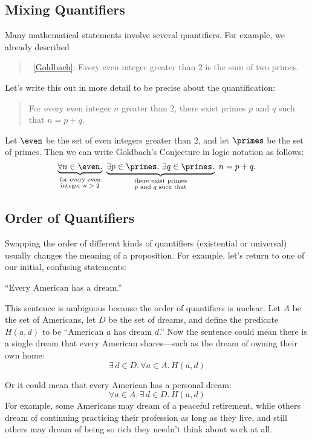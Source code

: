 \subsection{Mixing Quantifiers}

Many mathematical statements involve several quantifiers.  For
example, we already described
%
\begin{quote}
 ~\ref{Goldbach}: Every even integer
 greater than 2 is the sum of two primes.
\end{quote}
Let's write this out in more detail to be precise about the
quantification:
%
\begin{quote}
For every even integer $n$ greater than 2,
there exist primes $p$ and $q$ such that $n = p + q$.
\end{quote}
%
Let $\even$ be the set of even integers greater than 2, and let $\primes$ be the
set of primes.  Then we can write Goldbach's Conjecture in logic
notation as follows:
%
\[
\underbrace{\forall n \in \even.}_{\substack
    {\text{for every even} \\
     \text{integer $n > 2$}}}
\
\underbrace{\exists p \in \primes.\ \exists q \in \primes.}_{\substack
    {\text{there exist primes} \\
     \text{$p$ and $q$ such that}}}
\ n = p + q.
\]

\subsection{Order of Quantifiers}

Swapping the order of different kinds of quantifiers (existential or
universal) usually changes the meaning of a proposition.  For example,
let's return to one of our initial, confusing statements:
\begin{center}
``Every American has a dream.''
\end{center}

This sentence is ambiguous because the order of quantifiers is
unclear.  Let $A$ be the set of Americans, let $D$ be the set of
dreams, and define the predicate $H(a, d)$ to be ``American $a$ has
dream $d$.''  Now the sentence could mean there is a single dream
that every American shares---such as the dream of owning their own
home:
\[
\exists\, d \in D.\, \forall a \in A.\, H(a, d)
\]

Or it could mean that every American has a personal dream:
\[
\forall a \in A.\, \exists\, d \in D.\, H(a, d)
\]
For example, some Americans may dream of a peaceful retirement, while
others dream of continuing practicing their profession as long as they
live, and still others may dream of being so rich they needn't think
about work at all.

